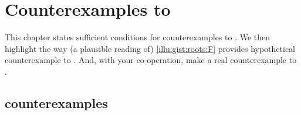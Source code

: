 \chapter{Counterexamples to \issueInclusion{}}
\label{cha:ces}

\begin{note}
  This chapter states sufficient conditions for counterexamples to \issueInclusion{}.
  We then highlight the way (a plausible reading of) \autoref{illu:gist:roots:F} provides hypothetical counterexample to \issueInclusion{}.
  And, with your co-operation, make a real counterexample to \issueInclusion{}.
\end{note}



\section{ counterexamples}
\label{sec:counterexamples}


